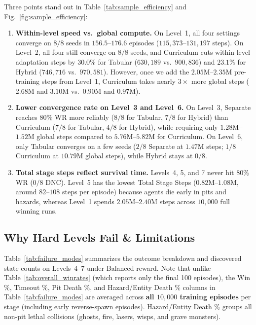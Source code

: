 Three points stand out in Table~\ref{tab:sample_efficiency} and Fig.~\ref{fig:sample_efficiency}:
\begin{enumerate}
    \item \textbf{Within-level speed vs.\ global compute.} On Level~1, all four settings converge on $8/8$ seeds in $156.5$--$176.6$ episodes ($115{,}373$--$131{,}197$ steps). On Level~2, all four still converge on $8/8$ seeds, and Curriculum cuts within-level adaptation steps by $30.0\%$ for Tabular ($630{,}189$ vs.\ $900{,}836$) and $23.1\%$ for Hybrid ($746{,}716$ vs.\ $970{,}581$). However, once we add the $2.05\text{M}$--$2.35\text{M}$ pre-training steps from Level~1, Curriculum takes nearly $3\times$ more global steps ($2.68\text{M}$ and $3.10\text{M}$ vs.\ $0.90\text{M}$ and $0.97\text{M}$).
    \item \textbf{Lower convergence rate on Level~3 and Level~6.} On Level~3, Separate reaches $80\%$ WR more reliably ($8/8$ for Tabular, $7/8$ for Hybrid) than Curriculum ($7/8$ for Tabular, $4/8$ for Hybrid), while requiring only $1.28\text{M}$--$1.52\text{M}$ global steps compared to $5.76\text{M}$--$5.82\text{M}$ for Curriculum. On Level~6, only Tabular converges on a few seeds ($2/8$ Separate at $1.47\text{M}$ steps; $1/8$ Curriculum at $10.79\text{M}$ global steps), while Hybrid stays at $0/8$.
    \item \textbf{Total stage steps reflect survival time.} Levels~4, 5, and 7 never hit $80\%$ WR ($0/8$ DNC). Level~5 has the lowest Total Stage Steps ($0.82\text{M}$--$1.08\text{M}$, around $82$--$108$ steps per episode) because agents die early in pits and hazards, whereas Level~1 spends $2.05\text{M}$--$2.40\text{M}$ steps across $10{,}000$ full winning runs.
\end{enumerate}

\subsection{Why Hard Levels Fail \& Limitations}
\label{subsec:failures}

Table~\ref{tab:failure_modes} summarizes the outcome breakdown and discovered state counts on Levels~4--7 under Balanced reward. Note that unlike Table~\ref{tab:overall_winrates} (which reports only the final 100 episodes), the Win \%, Timeout \%, Pit Death \%, and Hazard/Entity Death \% columns in Table~\ref{tab:failure_modes} are averaged across \textbf{all $10{,}000$ training episodes} per stage (including early reverse-spawn episodes). Hazard/Entity Death \% groups all non-pit lethal collisions (ghosts, fire, lasers, wisps, and grave monsters).

